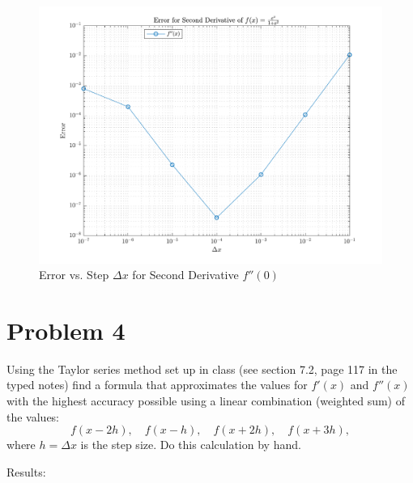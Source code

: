 \begin{solution}
\begin{itemize}
\begin{figure}[!hbtp]
        \includegraphics[width=0.75\linewidth]{../src/hw6_p3_4.pdf}
        \caption{Error vs. Step $\Delta x$ for Second Derivative $f''(0)$}%
        \label{fig:p32}
      \end{figure}
  \end{itemize}
\end{solution}

\section{Problem 4}%
\label{sec:problem_4}
Using the Taylor series method set up in class (see section 7.2, page 117 in the typed notes) find a formula that approximates the values for $f'(x)$ and $f''(x)$ with the highest accuracy possible using a linear combination (weighted sum) of the values:
\begin{equation*}
  f(x - 2h), \quad f(x - h), \quad f(x + 2h), \quad f(x + 3h),
\end{equation*}
where $h = \Delta x$ is the step size. Do this calculation by hand.
\begin{solution}
  Results:
  
  
\end{solution}
